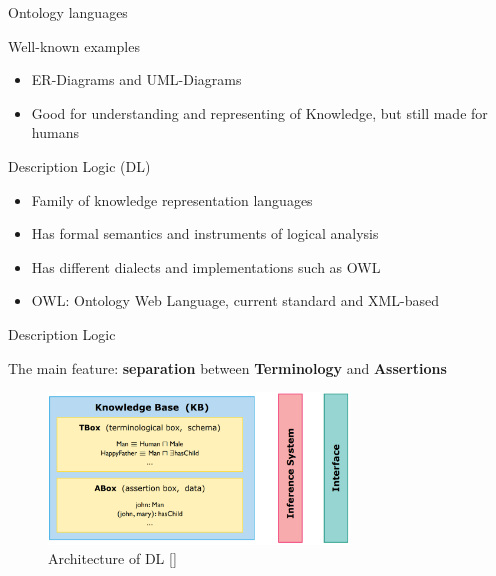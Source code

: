 \documentclass[16:9,en,navbarside]{sdqbeamer}
\begin{document}
\begin{frame}{Ontology languages}
    
    \begin{exampleblock}{Well-known examples}
        \begin{itemize}
            \item ER-Diagrams and UML-Diagrams
            \item Good for understanding and representing of Knowledge, but still made for humans
        \end{itemize}
    \end{exampleblock}
    \pause
    \begin{block}{Description Logic (DL)}
        \begin{itemize}
            \item Family of knowledge representation languages  
            \pause
            \item Has formal semantics and instruments of logical analysis
            \pause
            \item Has different dialects and implementations such as OWL
            \pause
            \item OWL: Ontology Web Language, current standard and XML-based
            \pause
        \end{itemize}
    \end{block}
   
\end{frame}


\begin{frame}{Description Logic}
    \begin{alertblock}{The main feature:  \textbf{separation} between \textbf{Terminology} and \textbf{Assertions}}

    
    \begin{figure}
		\centering
		\includegraphics[width=8cm]{images/ELDL.PNG}
		\caption{Architecture of DL [\cite{Kon10}]}
		\label{fig:ArchDL}
	\end{figure}

	\end{alertblock}
\end{frame}
\end{document}
